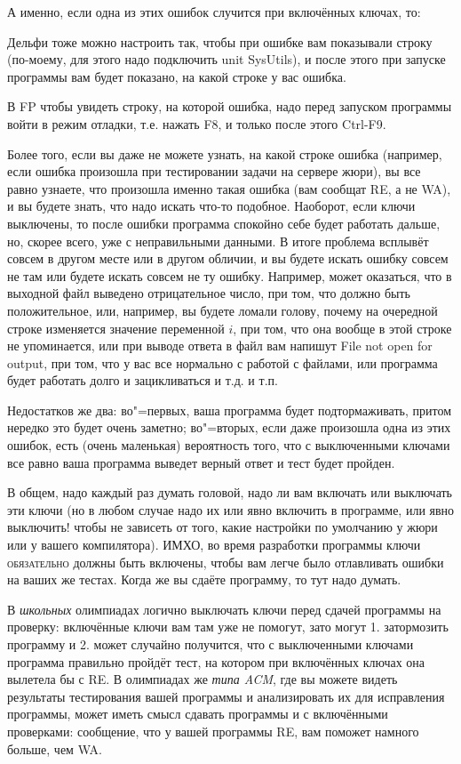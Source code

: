 А именно, если одна из этих ошибок случится при включённых ключах, то:

Дельфи тоже можно настроить так, чтобы при ошибке 
вам показывали строку (по-моему, для этого надо подключить unit SysUtils), и после этого при 
запуске программы вам будет показано, на какой строке у вас ошибка.

В FP чтобы увидеть строку, на которой ошибка, надо перед запуском программы войти в режим отладки, 
т.е. нажать F8, и только после этого Ctrl-F9.
                                             
Более того, если вы даже не можете узнать, на какой строке ошибка (например, если ошибка произошла при 
тестировании задачи на сервере жюри), вы все равно узнаете, что произошла именно такая ошибка (вам 
сообщат RE, а не WA), и вы будете знать, что надо искать что-то подобное. Наоборот, если ключи 
выключены, то после ошибки программа спокойно себе будет работать дальше, но, скорее всего, уже с 
неправильными данными. В итоге проблема всплывёт совсем в другом месте или в другом обличии, и вы 
будете искать ошибку совсем не там или будете искать совсем не ту ошибку. Например, может 
оказаться, что в выходной файл выведено отрицательное число, при том, что должно быть 
положительное, или, например, вы будете ломали голову, почему на очередной строке изменяется 
значение переменной $i$, при том, что она вообще в этой строке не упоминается, или при выводе 
ответа в файл вам напишут File not open for output, при том, что у вас все нормально с работой с 
файлами, или программа будет работать долго и зацикливаться и т.д. и т.п. 

Недостатков же два: во"=первых, ваша программа будет подтормаживать, притом нередко это будет очень 
заметно; во"=вторых, если даже произошла одна из этих ошибок, есть (очень маленькая) вероятность 
того, что с выключенными ключами все равно ваша программа выведет верный ответ и тест будет 
пройден.

В общем, надо каждый раз думать головой, надо ли вам включать или выключать эти ключи (но в любом 
случае надо их или явно включить в программе, или явно выключить! чтобы не зависеть от того, какие 
настройки по умолчанию у жюри или у вашего компилятора). ИМХО, во время разработки программы ключи 
\textsc{обязательно} должны быть включены, чтобы вам легче было отлавливать ошибки на ваших же 
тестах. Когда же вы сдаёте программу, то тут надо думать.

В \textit{школьных} олимпиадах логично выключать ключи перед сдачей программы на 
проверку: включённые ключи вам там уже не помогут, зато могут 1. затормозить программу и 2. может 
случайно получится, что с выключенными ключами программа правильно пройдёт тест, на котором при 
включённых ключах она 
вылетела бы с RE. В олимпиадах же \textit{типа ACM}, где вы можете видеть результаты тестирования вашей 
программы и анализировать их для исправления программы, может иметь смысл сдавать программы и с 
включёнными проверками: сообщение, что у вашей программы RE, вам поможет намного больше, чем WA.

